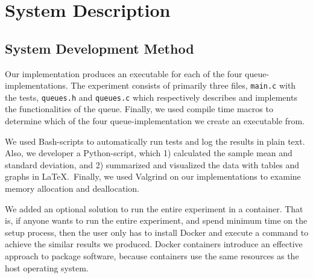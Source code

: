 \documentclass[a4paper,11pt]{kth-mag}
\newcommand*{\skippara}{\par\vspace{\baselineskip} \noindent}
\begin{document}


\chapter{System Description}


\section{System Development Method}
Our implementation produces an executable for each of the four queue-implementations.
The experiment consists of primarily three files, \texttt{main.c} with the tests, \texttt{queues.h} and \texttt{queues.c} which respectively describes and implements the functionalities of the queue.
Finally, we used compile time macros to determine which of the four queue-implementation we create an executable from.

\skippara We used Bash-scripts to automatically run tests and log the results in plain text.
Also, we developer a Python-script, which 1) calculated the sample mean and standard deviation, and 2) summarized and visualized the data with tables and graphs in \LaTeX.\
Finally, we used Valgrind on our implementations to examine memory allocation and deallocation.

\skippara We added an optional solution to run the entire experiment in a container.
That is, if anyone wants to run the entire experiment, and spend minimum time on the setup process, then the user only has to install Docker and execute a command to achieve the similar results we produced.
Docker containers introduce an effective approach to package software, because containers use the same resources as the host operating system.
\end{document}

